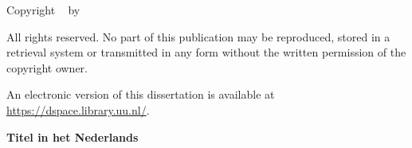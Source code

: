 \begin{titlepage}
             	\vspace{\bigskipamount}

               	\noindent Copyright \textcopyright\ \the\year{} by {\makeatletter\@firstname~\@lastname \makeatother}

               All rights reserved. No part of this publication may be reproduced, stored in a retrieval system or transmitted in any form without the written permission of the copyright owner.

                \noindent An electronic version of this dissertation is available at \url{https://dspace.library.uu.nl/}.







        \clearpage

        \thispagestyle{empty}

	\begin{center}

		\vspace*{2\bigskipamount}

		{\makeatletter
			\titlestyle\bfseries\Huge\@title
			\makeatother}

		{\makeatletter
			\ifx\@subtitle\undefined\else
			\bigskip
			\titlefont\titleshape\LARGE\@subtitle
			\fi
			\makeatother}

		\vfill


		{\LARGE\titlefont\bfseries Titel in het Nederlands}


\end{center}
\end{titlepage}
